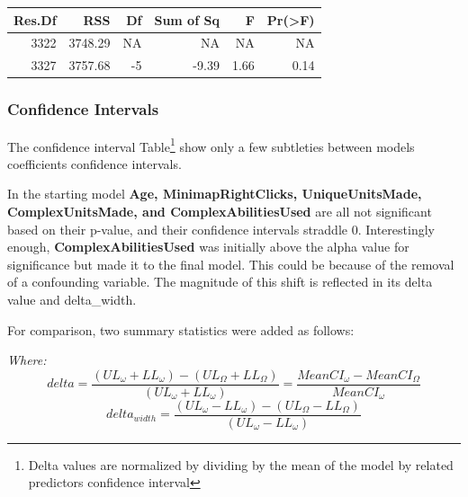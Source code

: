 \documentclass[]{article}
\begin{document}
\begin{longtable}[]{@{}rrrrrr@{}}
\toprule
Res.Df & RSS & Df & Sum of Sq & F & Pr(\textgreater{}F)\tabularnewline
\midrule
\endhead
3322 & 3748.29 & NA & NA & NA & NA\tabularnewline
3327 & 3757.68 & -5 & -9.39 & 1.66 & 0.14\tabularnewline
\bottomrule
\end{longtable}

\hypertarget{confidence-intervals}{%
\subsubsection{Confidence Intervals}\label{confidence-intervals}}

The confidence interval Table\footnote{Delta values are normalized by
  dividing by the mean of the model by related predictors confidence
  interval} show only a few subtleties between models coefficients
confidence intervals.

In the starting model \textbf{Age, MinimapRightClicks, UniqueUnitsMade,
ComplexUnitsMade, and ComplexAbilitiesUsed} are all not significant
based on their p-value, and their confidence intervals straddle 0.
Interestingly enough, \textbf{ComplexAbilitiesUsed} was initially above
the alpha value for significance but made it to the final model. This
could be because of the removal of a confounding variable. The magnitude
of this shift is reflected in its delta value and delta\_width.

For comparison, two summary statistics were added as follows:

\emph{Where:}
\[delta=\frac{(UL_\omega+LL_\omega)-(UL_\Omega+LL_\Omega)}{(UL_\omega+LL_\omega)}=\frac{MeanCI_\omega-MeanCI_\Omega}{MeanCI_\omega}\]
\[delta_{width}=\frac{(UL_\omega-LL_\omega)-(UL_\Omega-LL_\Omega)}{(UL_\omega-LL_\omega)}\]
\end{document}
